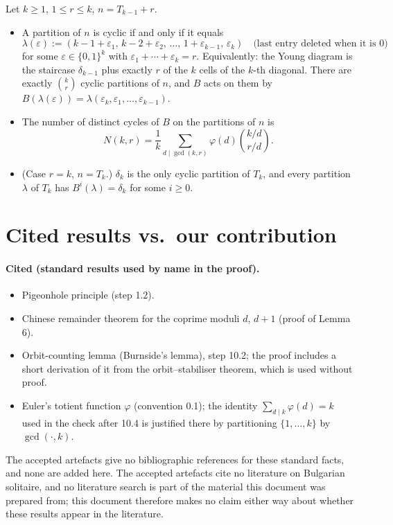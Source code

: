 \documentclass[11pt]{article}
\begin{document}
Let $k\ge1$, $1\le r\le k$, $n=T_{k-1}+r$.
\begin{itemize}
\item[(ii)(a)] A partition of $n$ is cyclic if and only if it equals
\[
\lambda(\varepsilon):=(k-1+\varepsilon_1,\,k-2+\varepsilon_2,\,\ldots,\,1+\varepsilon_{k-1},\,\varepsilon_k)
\quad\text{(last entry deleted when it is $0$)}
\]
for some $\varepsilon\in\{0,1\}^k$ with $\varepsilon_1+\cdots+\varepsilon_k=r$. Equivalently: the Young diagram
is the staircase $\delta_{k-1}$ plus exactly $r$ of the $k$ cells of the $k$-th diagonal. There are exactly
$\binom kr$ cyclic partitions of $n$, and $B$ acts on them by
$B(\lambda(\varepsilon))=\lambda(\varepsilon_k,\varepsilon_1,\ldots,\varepsilon_{k-1})$.
\item[(ii)(b)] The number of distinct cycles of $B$ on the partitions of $n$ is
\[
N(k,r)=\frac1k\sum_{d\mid\gcd(k,r)}\varphi(d)\binom{k/d}{r/d}.
\]
\item[(i)] (Case $r=k$, $n=T_k$.) $\delta_k$ is the only cyclic partition of $T_k$, and every partition
$\lambda$ of $T_k$ has $B^i(\lambda)=\delta_k$ for some $i\ge0$.
\end{itemize}

\section{Cited results vs.\ our contribution}

\paragraph{Cited (standard results used by name in the proof).}
\begin{itemize}
\item Pigeonhole principle (step 1.2).
\item Chinese remainder theorem for the coprime moduli $d$, $d+1$ (proof of Lemma 6).
\item Orbit-counting lemma (Burnside's lemma), step 10.2; the proof includes a short derivation of it
from the orbit--stabiliser theorem, which is used without proof.
\item Euler's totient function $\varphi$ (convention 0.1); the identity $\sum_{d\mid k}\varphi(d)=k$ used in the
check after 10.4 is justified there by partitioning $\{1,\ldots,k\}$ by $\gcd(\cdot,k)$.
\end{itemize}
The accepted artefacts give no bibliographic references for these standard facts, and none are added here.
The accepted artefacts cite no literature on Bulgarian solitaire, and no literature search is part of the
material this document was prepared from; this document therefore makes no claim either way about whether
these results appear in the literature.
\end{document}
